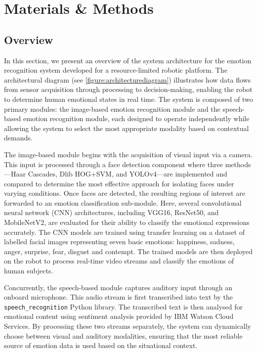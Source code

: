\chapter{Materials \& Methods}
\section{Overview}

In this section, we present an overview of the system architecture for the emotion recognition system developed for a resource-limited robotic platform. The architectural diagram (see \ref{figure:architecturediagram}) illustrates how data flows from sensor acquisition through processing to decision-making, enabling the robot to determine human emotional states in real time. The system is composed of two primary modules: the image-based emotion recognition module and the speech-based emotion recognition module, each designed to operate independently while allowing the system to select the most appropriate modality based on contextual demands.

The image-based module begins with the acquisition of visual input via a camera. This input is processed through a face detection component where three methods---Haar Cascades, Dlib HOG+SVM, and YOLOv4---are implemented and compared to determine the most effective approach for isolating faces under varying conditions. Once faces are detected, the resulting regions of interest are forwarded to an emotion classification sub-module. Here, several convolutional neural network (CNN) architectures, including VGG16, ResNet50, and MobileNetV2, are evaluated for their ability to classify the emotional expressions accurately. The CNN models are trained using transfer learning on a dataset of labelled facial images representing seven basic emotions: happiness, sadness, anger, surprise, fear, disgust and contempt. The trained models are then deployed on the robot to process real-time video streams and classify the emotions of human subjects.

Concurrently, the speech-based module captures auditory input through an onboard microphone. This audio stream is first transcribed into text by the \texttt{speech\_recognition} Python library. The transcribed text is then analysed for emotional content using sentiment analysis provided by IBM Watson Cloud Services. By processing these two streams separately, the system can dynamically choose between visual and auditory modalities, ensuring that the most reliable source of emotion data is used based on the situational context.

